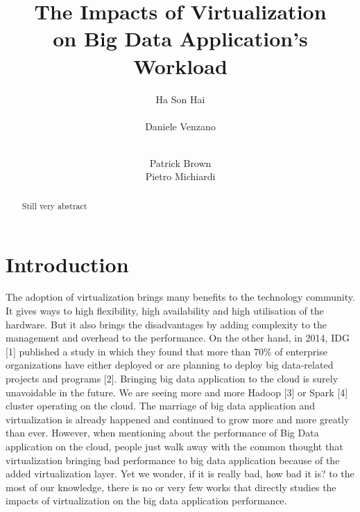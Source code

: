 \documentclass{acmsig}
\begin{document}
\title{The Impacts of Virtualization\\ on Big Data Application's Workload}


\author{
\alignauthor
Ha Son Hai\\
       \\
\alignauthor
Daniele Venzano\\
       \\
\and
\alignauthor
Patrick Brown
       \\
\alignauthor
Pietro Michiardi
       \\
}

\maketitle


\begin{abstract}
Still very abstract
\end{abstract}

\section{Introduction}

The adoption of virtualization brings many benefits to the technology community. It gives ways to high flexibility, high availability and high utilisation of the hardware. But it also brings the disadvantages by adding complexity to the management and overhead to the performance. On the other hand, in 2014, IDG [1] published a study in which they found that more than 70\% of enterprise organizations have either deployed or are planning to deploy big data-related projects and programs [2]. Bringing big data application to the cloud is surely unavoidable in the future. We are seeing more and more Hadoop [3] or Spark [4] cluster operating on the cloud. The marriage of big data application and virtualization is already happened and continued to grow more and more greatly than ever. However, when mentioning about the performance of Big Data application on the cloud, people just walk away with the common thought that virtualization bringing bad performance to big data application because of the added virtualization layer. Yet we wonder, if it is really bad, how bad it is? to the most of our knowledge, there is no or very few works that directly studies the impacts of virtualization on the big data application performance.
\end{document}
